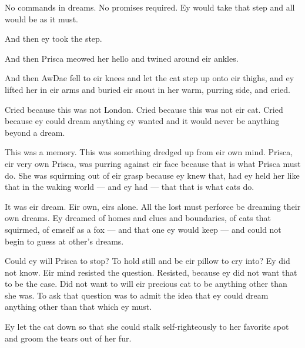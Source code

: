 No commands in dreams. No promises required. Ey would take that step and all would be as it must.

And then ey took the step.

And then Prisca meowed her hello and twined around eir ankles.

And then AwDae fell to eir knees and let the cat step up onto eir thighs, and ey lifted her in eir arms and buried eir snout in her warm, purring side, and cried.

Cried because this was not London. Cried because this was not eir cat. Cried because ey could dream anything ey wanted and it would never be anything beyond a dream.

This was a memory. This was something dredged up from eir own mind. Prisca, eir very own Prisca, was purring against eir face because that is what Prisca must do. She was squirming out of eir grasp because ey knew that, had ey held her like that in the waking world — and ey had — that that is what cats do.

It was eir dream. Eir own, eirs alone. All the lost must perforce be dreaming their own dreams. Ey dreamed of homes and clues and boundaries, of cats that squirmed, of emself as a fox — and that one ey would keep — and could not begin to guess at other's dreams.

Could ey will Prisca to stop? To hold still and be eir pillow to cry into? Ey did not know. Eir mind resisted the question. Resisted, because ey did not want that to be the case. Did not want to will eir precious cat to be anything other than she was. To ask that question was to admit the idea that ey could dream anything other than that which ey must.

Ey let the cat down so that she could stalk self-righteously to her favorite spot and groom the tears out of her fur.
